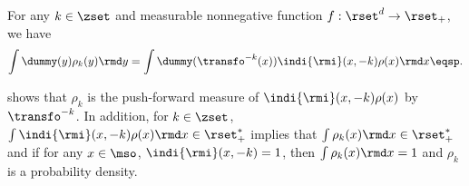 \begin{lemma}
\label{theo:inf_non_eq_0}
For any $k \in \zset$ and  measurable nonnegative function $f:\rset^d \to \rset_+$, we have
\begin{equation}
    \label{eq:inf_non_eq_av_0}
    \int \dummy(y)    \rho_k(y)\rmd y =
  \int \dummy(\transfo^{-k}(x)) \indi{\rmi}(x,-k)\rho(x)\rmd x  \eqsp.
\end{equation}
\end{lemma}
 shows that $\rho_k$ is the push-forward
measure of $\indi{\rmi}(x,-k)\rho({x})$ by $\transfo^{-k}$. In addition, for
$k \in \zset$, $ \int \indi{\rmi}(x,-k)\rho({x})\rmd x \in \rset^*_+$ implies that $\int \rho_k(x) \rmd x \in \rset^*_+$ and if
for any $x \in \mso$, $\indi{\rmi}(x,-k) =
1$, then $\int \rho_k(x) \rmd x = 1$ and $\rho_k$ is a probability density. 

